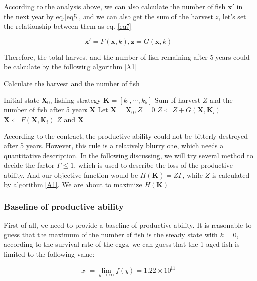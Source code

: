 \documentclass{IEEEtran}
\begin{document}
According to the analysis above, we can also calculate the number of fish $\bm x'$ in the next year by eq.\ref{eq5}, and we can also get the sum of the harvest $z$, let's set the relationship between them as eq. \ref{eq7}

\begin{equation}
    \label{eq7}
    \bm x' = F(\bm x, k), \bm z = G(\bm x,k)
\end{equation}

Therefore, the total harvest and the number of fish remaining after 5 years could be calculate by the following algorithm \ref{A1}

\begin{algorithm}[h]
    \caption{Calculate the harvest and the number of fish}\label{A1}
    \begin{algorithmic}
        \Require Initial state $\bm X_0$, fishing strategy $\bm K = [k_1,\cdots,k_5]$ 
        \Ensure Sum of harvest $Z$ and the number of fish after 5 years $\bm X$
        \State Let $\bm X = \bm X_0, Z = 0$
        \State $Z \Leftarrow Z + G(\bm X,\bm K_i)$
        \State $\bm X \Leftarrow F(\bm X, \bm K_i)$
        \EndFor
    \State \Return $Z$ and $\bm X$
    \end{algorithmic}
\end{algorithm}

According to the contract, the productive ability could not be bitterly destroyed after 5 years. However, this rule is a relatively blurry one, which needs a quantitative description. In the following discussing, we will try several method to decide the factor $\Gamma \le 1$, which is used to describe the loss of the productive ability. And our objective function would be $H(\bm K) = Z\Gamma$, while $Z$ is calculated by algorithm \ref{A1}. We are about to maximize $H(\bm K)$

\subsubsection{Baseline of productive ability}

First of all, we need to provide a baseline of productive ability. It is reasonable to guess that the maximum of the number of fish is the steady state with $k = 0$, according to the survival rate of the eggs, we can guess that the 1-aged fish is limited to the following value:

\begin{equation}
    x_1 = \lim_{y\to\infty} f(y) = 1.22 \times 10^{11}
\end{equation}
\end{document}
